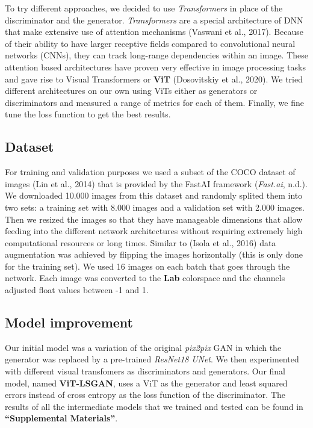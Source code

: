 \documentclass[
]{article}
\begin{document}
To try different approaches, we decided to use \emph{Transformers} in
place of the discriminator and the generator. \emph{Transformers} are a
special architecture of DNN that make extensive use of attention
mechanisms (Vaswani et al., 2017). Because of their ability to have
larger receptive fields compared to convolutional neural networks
(CNNs), they can track long-range dependencies within an image. These
attention based architectures have proven very effective in image
processing tasks and gave rise to Visual Transformers or \textbf{ViT}
(Dosovitskiy et al., 2020). We tried different architectures on our own
using ViTs either as generators or discriminators and measured a range
of metrics for each of them. Finally, we fine tune the loss function to
get the best results.

\hypertarget{dataset}{%
\subsection{Dataset}\label{dataset}}

For training and validation purposes we used a subset of the COCO
dataset of images (Lin et al., 2014) that is provided by the FastAI
framework (\emph{Fast.ai}, n.d.). We downloaded 10.000 images from this
dataset and randomly splited them into two sets: a training set with
8.000 images and a validation set with 2.000 images. Then we resized the
images so that they have manageable dimensions that allow feeding into
the different network architectures without requiring extremely high
computational resources or long times. Similar to (Isola et al., 2016)
data augmentation was achieved by flipping the images horizontally (this
is only done for the training set). We used 16 images on each batch that
goes through the network. Each image was converted to the \textbf{Lab}
colorspace and the channels adjusted float values between -1 and 1.

\hypertarget{model-improvement}{%
\subsection{Model improvement}\label{model-improvement}}

Our initial model was a variation of the original \emph{pix2pix} GAN in
which the generator was replaced by a pre-trained \emph{ResNet18}
\emph{UNet}. We then experimented with different visual transfomers as
discriminators and generators. Our final model, named
\textbf{ViT-LSGAN}, uses a ViT as the generator and least squared errors
instead of cross entropy as the loss function of the discriminator. The
results of all the intermediate models that we trained and tested can be
found in \textbf{``Supplemental Materials''}.
\end{document}
